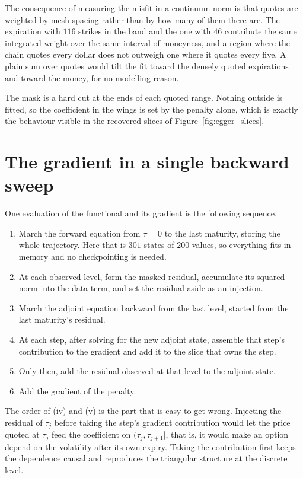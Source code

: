 The consequence of measuring the misfit in a continuum norm is that quotes are weighted by
mesh spacing rather than by how many of them there are. The expiration with $116$ strikes in
the band and the one with $46$ contribute the same integrated weight over the same interval of
moneyness, and a region where the chain quotes every dollar does not outweigh one where it
quotes every five. A plain sum over quotes would tilt the fit toward the densely quoted
expirations and toward the money, for no modelling reason.

The mask is a hard cut at the ends of each quoted range. Nothing outside is fitted, so the
coefficient in the wings is set by the penalty alone, which is exactly the behaviour visible
in the recovered slices of Figure~\ref{fig:egger_slices}.

\section{The gradient in a single backward sweep}
\label{subsec:gradient_sweep}

One evaluation of the functional and its gradient is the following sequence.

\begin{enumerate}[label=(\roman*)]
    \item March the forward equation from $\tau = 0$ to the last maturity, storing the whole
          trajectory. Here that is $301$ states of $200$ values, so everything fits in memory
          and no checkpointing is needed.
    \item At each observed level, form the masked residual, accumulate its squared norm into
          the data term, and set the residual aside as an injection.
    \item March the adjoint equation backward from the last level, started from the last
          maturity's residual.
    \item At each step, after solving for the new adjoint state, assemble that step's
          contribution to the gradient and add it to the slice that owns the step.
    \item Only then, add the residual observed at that level to the adjoint state.
    \item Add the gradient of the penalty.
\end{enumerate}

The order of (iv) and (v) is the part that is easy to get wrong. Injecting the residual of
$\tau_j$ before taking the step's gradient contribution would let the price quoted at $\tau_j$
feed the coefficient on $(\tau_j,\tau_{j+1}]$, that is, it would make an option depend on the
volatility after its own expiry. Taking the contribution first keeps the dependence causal and
reproduces the triangular structure at the discrete level.

